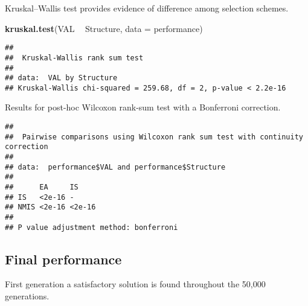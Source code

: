 \documentclass[]{book}
\newenvironment{Shaded}{\begin{snugshade}}{\end{snugshade}}
\newcommand{\DataTypeTok}[1]{\textcolor[rgb]{0.13,0.29,0.53}{#1}}
\newcommand{\KeywordTok}[1]{\textcolor[rgb]{0.13,0.29,0.53}{\textbf{#1}}}
\newcommand{\NormalTok}[1]{#1}
\newcommand{\OperatorTok}[1]{\textcolor[rgb]{0.81,0.36,0.00}{\textbf{#1}}}
\newcommand{\OtherTok}[1]{\textcolor[rgb]{0.56,0.35,0.01}{#1}}
\newcommand{\StringTok}[1]{\textcolor[rgb]{0.31,0.60,0.02}{#1}}
\begin{document}
Kruskal--Wallis test provides evidence of difference among selection schemes.

\begin{Shaded}
\begin{Highlighting}[]
\KeywordTok{kruskal.test}\NormalTok{(VAL }\OperatorTok{~}\StringTok{ }\NormalTok{Structure, }\DataTypeTok{data =}\NormalTok{ performance)}
\end{Highlighting}
\end{Shaded}

\begin{verbatim}
## 
##  Kruskal-Wallis rank sum test
## 
## data:  VAL by Structure
## Kruskal-Wallis chi-squared = 259.68, df = 2, p-value < 2.2e-16
\end{verbatim}

Results for post-hoc Wilcoxon rank-sum test with a Bonferroni correction.

\begin{Shaded}
\end{Shaded}

\begin{verbatim}
## 
##  Pairwise comparisons using Wilcoxon rank sum test with continuity correction 
## 
## data:  performance$VAL and performance$Structure 
## 
##      EA     IS    
## IS   <2e-16 -     
## NMIS <2e-16 <2e-16
## 
## P value adjustment method: bonferroni
\end{verbatim}

\hypertarget{final-performance-4}{%
\subsection{Final performance}\label{final-performance-4}}

First generation a satisfactory solution is found throughout the 50,000 generations.
\end{document}
